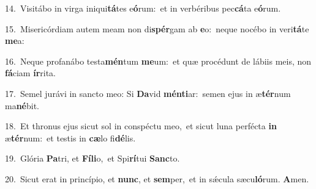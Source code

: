 {\numbfont\textcolor{\numbcolor}{14.}}~Visitábo in virga iniqui\-\textbf{tá}\-tes e\-\textbf{ó}\-rum:~\star et in verbéribus pec\-\textbf{cá}\-ta e\-\textbf{ó}\-rum.\par
{\numbfont\textcolor{\numbcolor}{15.}}~Misericórdiam autem meam non di\-\textbf{spér}\-gam ab \textbf{e}\-o:~\star neque nocébo in veri\-\textbf{tá}\-te \textbf{me}\-a:\par
{\numbfont\textcolor{\numbcolor}{16.}}~Neque profanábo testa\-\textbf{mén}\-tum \textbf{me}\-um:~\star et quæ procédunt de lábiis meis, non \textbf{fá}\-ciam \textbf{ír}\-rita.\par
{\numbfont\textcolor{\numbcolor}{17.}}~Semel jurávi in sancto meo: Si \textbf{Da}\-vid \textbf{mén}\-\textbf{ti}ar:~\star semen ejus in æ\-\textbf{tér}\-num ma\-\textbf{né}\-bit.\par
{\numbfont\textcolor{\numbcolor}{18.}}~Et thronus ejus sicut sol in conspéctu meo,~\dagger et sicut luna perfécta \textbf{in} æ\-\textbf{tér}\-num:~\star et testis in \textbf{cæ}\-lo fi\-\textbf{dé}\-lis.\par
{\numbfont\textcolor{\numbcolor}{19.}}~Glória \textbf{Pa}\-tri, et \textbf{Fí}\-\textbf{li}o,~\star et Spi\-\textbf{rí}\-tui \textbf{Sanc}\-to.\par
{\numbfont\textcolor{\numbcolor}{20.}}~Sicut erat in princípio, et \textbf{nunc}\-, et \textbf{sem}\-per,~\star et in sǽcula sæcu\-\textbf{ló}\-rum. \textbf{A}\-men.\par
